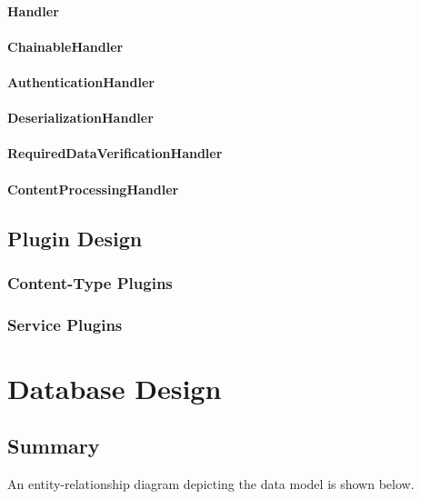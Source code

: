 \documentclass{report}
\begin{document}
			\subsubsection{Handler}
			\subsubsection{ChainableHandler}
			\subsubsection{AuthenticationHandler}
			\subsubsection{DeserializationHandler}
			\subsubsection{RequiredDataVerificationHandler}
			\subsubsection{ContentProcessingHandler}

	\section{Plugin Design}
		\subsection{Content-Type Plugins}
		\subsection{Service Plugins}

\chapter{Database Design}
\section{Summary}

An entity-relationship diagram depicting the data model is shown below.\\

\end{document}
